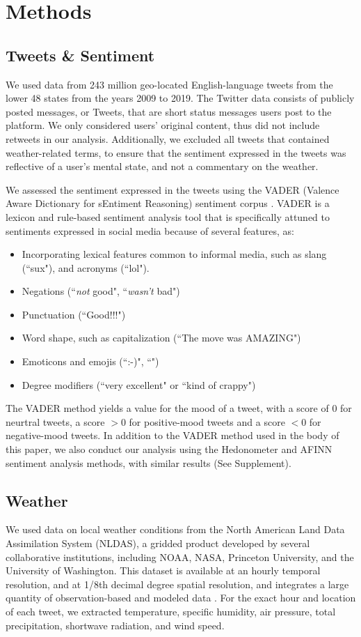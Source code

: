 \documentclass{article}
\begin{document}
\section{Methods}
\subsection{Tweets \& Sentiment}
We used data from 243 million geo-located English-language tweets from the lower 48 states from the years 2009 to 2019.  The Twitter data consists of publicly posted messages, or Tweets, that are short status messages users post to the platform.  We only considered users’ original content, thus did not include retweets in our analysis.  Additionally, we excluded all tweets that contained weather-related terms, to ensure that the sentiment expressed in the tweets was reflective of a user's mental state, and not a commentary on the weather.

We assessed the sentiment expressed in the tweets using the VADER (Valence Aware Dictionary for sEntiment Reasoning) sentiment corpus \cite{gilbert_vader_2014}. VADER is a lexicon and rule-based sentiment analysis tool that is specifically attuned to sentiments expressed in social media because of several features, as:

\begin{itemize}
  \item Incorporating lexical features common to informal media, such as slang (``sux"), and acronyms (``lol").
  \item Negations (``\textit{not} good", ``\textit{wasn't} bad")
  \item Punctuation (``Good!!!")
  \item Word shape, such as capitalization (``The move was AMAZING")
  \item Emoticons and emojis (``:-)", ``\emojismile")
  \item Degree modifiers (``very excellent" or ``kind of crappy")
\end{itemize} 

The VADER method yields a value for the mood of a tweet, with a score of 0 for neurtral tweets, a score $> 0$ for positive-mood tweets and a score $< 0$ for negative-mood tweets.  In addition to the VADER method used in the body of this paper, we also conduct our analysis using the Hedonometer and AFINN sentiment analysis methods, with similar results (See Supplement).

\subsection{Weather}
We used data on local weather conditions from the North American Land Data Assimilation System (NLDAS), a gridded product developed by several collaborative institutions, including NOAA, NASA, Princeton University, and the University of Washington.  This dataset is available at an hourly temporal resolution, and at 1/8th decimal degree spatial resolution, and integrates a large quantity of observation-based and modeled data  \cite{xia_continental-scale_2012}.  For the exact hour and location of each tweet, we extracted temperature, specific humidity, air pressure, total precipitation, shortwave radiation, and wind speed.  
\end{document}
